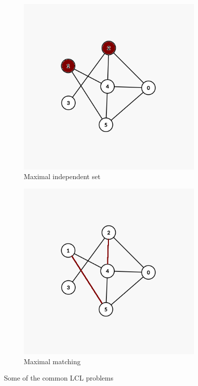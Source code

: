 \begin{figure}
  \hfill
  \begin{subfigure}[b]{0.49\textwidth}
      \centering
      \includegraphics[width=\textwidth]{images/maximal-ind-set.png}
      \caption{Maximal independent set}
      \label{fig:maximal-independent-set}
  \end{subfigure}
  \hfill
  \begin{subfigure}[b]{0.49\textwidth}
      \centering
      \includegraphics[width=\textwidth]{images/maximal-matching.png}
      \caption{Maximal matching}
      \label{fig:maximal-matching}
  \end{subfigure}
  \caption{Some of the common LCL problems}
  \label{fig:graph-problems}
\end{figure}

